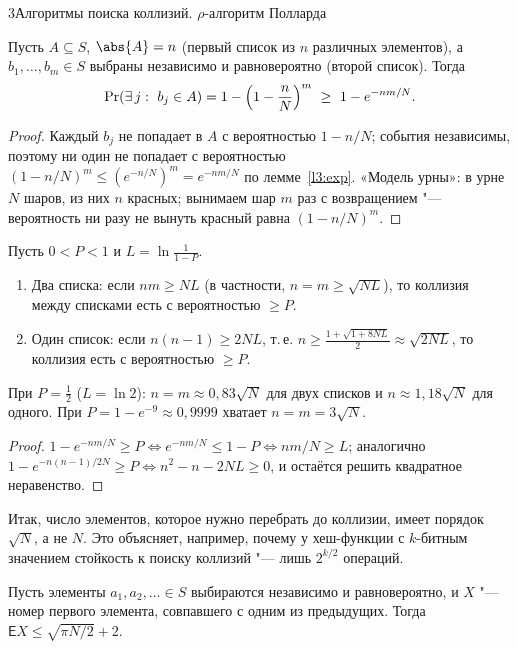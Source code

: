 \begin{lecture}{3}{Алгоритмы поиска коллизий. \texorpdfstring{$\rho$}{ρ}-алгоритм Полларда}
\begin{theorem}\label{l3:collision}
Пусть $A \subseteq S$, $\abs{A} = n$ (первый список из $n$ различных элементов), а
$b_1, \dots, b_m \in S$ выбраны независимо и равновероятно (второй список). Тогда
\[
  \Pr(\exists\, j:\ b_j \in A) = 1 - \Bigl(1 - \frac nN\Bigr)^m \ \ge\ 1 - e^{-nm/N}.
\]
\end{theorem}

\begin{proof}
Каждый $b_j$ не попадает в $A$ с вероятностью $1 - n/N$; события независимы, поэтому
ни один не попадает с вероятностью $(1 - n/N)^m \le (e^{-n/N})^m = e^{-nm/N}$
по лемме~\ref{l3:exp}. «Модель урны»: в урне $N$ шаров, из них $n$ красных; вынимаем
шар $m$ раз с возвращением "--- вероятность ни разу не вынуть красный равна
$(1 - n/N)^m$.
\end{proof}

\begin{corollary}\label{l3:lengths}
Пусть $0 < P < 1$ и $L = \ln\frac{1}{1 - P}$.
\begin{enumerate}
  \item Два списка: если $nm \ge N L$ (в частности, $n = m \ge \sqrt{N L}$), то коллизия
    между списками есть с вероятностью $\ge P$.
  \item Один список: если $n(n - 1) \ge 2 N L$, т.\,е.
    $n \ge \frac{1 + \sqrt{1 + 8NL}}{2} \approx \sqrt{2NL}$, то коллизия есть
    с вероятностью $\ge P$.
\end{enumerate}
При $P = \frac12$ ($L = \ln 2$): $n = m \approx 0{,}83\sqrt N$ для двух списков и
$n \approx 1{,}18\sqrt N$ для одного. При $P = 1 - e^{-9} \approx 0{,}9999$ хватает
$n = m = 3\sqrt N$.
\end{corollary}

\begin{proof}
$1 - e^{-nm/N} \ge P \iff e^{-nm/N} \le 1 - P \iff nm/N \ge L$; аналогично
$1 - e^{-n(n-1)/2N} \ge P \iff n^2 - n - 2NL \ge 0$, и остаётся решить квадратное неравенство.
\end{proof}

Итак, число элементов, которое нужно перебрать до коллизии, имеет порядок $\sqrt N$, а не $N$.
Это объясняет, например, почему у хеш-функции с $k$-битным значением стойкость к
поиску коллизий "--- лишь $2^{k/2}$ операций.


\begin{theorem}\label{l3:expected}
Пусть элементы $a_1, a_2, \dots \in S$ выбираются независимо и равновероятно, и $X$ "--- номер
первого элемента, совпавшего с одним из предыдущих. Тогда
$\mathsf{E}X \le \sqrt{\pi N/2} + 2$.
\end{theorem}


\end{lecture}
